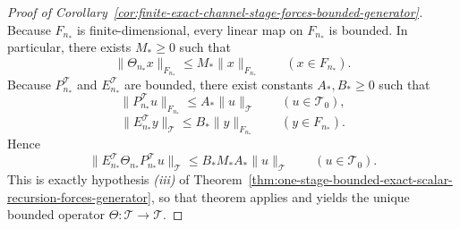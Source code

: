 \begin{proof}[Proof of Corollary~\ref{cor:finite-exact-channel-stage-forces-bounded-generator}]
\label{proof:cor:finite-exact-channel-stage-forces-bounded-generator}
Because \(F_{n_\ast}\) is finite-dimensional, every linear map on \(F_{n_\ast}\)
is bounded. In particular, there exists \(M_\ast\ge 0\) such that
\[
\|\Theta_{n_\ast}x\|_{F_{n_\ast}}\le M_\ast\|x\|_{F_{n_\ast}}
\qquad (x\in F_{n_\ast}).
\]
Because \(P_{n_\ast}^{\mathcal T}\) and \(E_{n_\ast}^{\mathcal T}\) are
bounded, there exist constants \(A_\ast,B_\ast\ge 0\) such that
\[
\|P_{n_\ast}^{\mathcal T}u\|_{F_{n_\ast}}
\le
A_\ast\|u\|_{\mathcal T}
\qquad (u\in\mathcal T_0),
\]
\[
\|E_{n_\ast}^{\mathcal T}y\|_{\mathcal T}
\le
B_\ast\|y\|_{F_{n_\ast}}
\qquad (y\in F_{n_\ast}).
\]
Hence
\[
\|E_{n_\ast}^{\mathcal T}\Theta_{n_\ast}P_{n_\ast}^{\mathcal T}u\|_{\mathcal T}
\le
B_\ast M_\ast A_\ast\|u\|_{\mathcal T}
\qquad (u\in\mathcal T_0).
\]
This is exactly hypothesis \emph{(iii)} of
Theorem~\ref{thm:one-stage-bounded-exact-scalar-recursion-forces-generator}, so
that theorem applies and yields the unique bounded operator
\(\Theta:\mathcal T\to\mathcal T\).
\end{proof}

